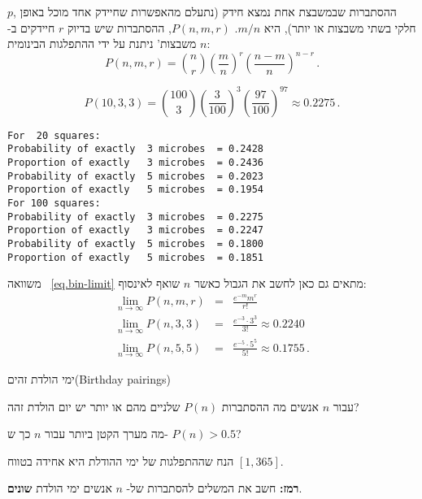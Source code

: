 \solution{}

$p$,
ההסתברות שבמשבצת אחת נמצא חידק (נתעלם מהאפשרות שחיידק אחד מוכל באופן חלקי בשתי משבצות או יותר), היא
$m/n$.
$P(n,m,r)$,
ההסתברות שיש בדיוק 
$r$
חיידקים ב-%
$n$
משבצות' ניתנת על ידי ההתפלגות הבינומית:
\[
P(n,m,r) = {n \choose r} \left(\frac{m}{n}\right)^r \left(\frac{n-m}{n}\right)^{n-r}\,.
\]

\[
P(10,3,3) = {100 \choose 3} \left(\frac{3}{100}\right)^3 \left(\frac{97}{100}\right)^{97}\approx 0.2275\,.
\]

\sml{}
\begin{verbatim}
For  20 squares:
Probability of exactly  3 microbes  = 0.2428
Proportion of exactly   3 microbes  = 0.2436
Probability of exactly  5 microbes  = 0.2023
Proportion of exactly   5 microbes  = 0.1954
For 100 squares:
Probability of exactly  3 microbes  = 0.2275
Proportion of exactly   3 microbes  = 0.2247
Probability of exactly  5 microbes  = 0.1800
Proportion of exactly   5 microbes  = 0.1851
\end{verbatim}


משוואה%
~\ref{eq.bin-limit}
מתאים גם כאן לחשב את הגבול כאשר 
$n$
שואף לאינסוף:
\begin{eqnarray*}
\lim_{n\rightarrow \infty}P(n,m,r) &=& \frac{e^{-m}m^r}{r!}\\
\lim_{n\rightarrow \infty} P(n,3,3) &=& \frac{e^{-3}\cdot 3^3}{3!}\approx 0.2240\\
\lim_{n\rightarrow \infty} P(n,5,5) &=& \frac{e^{-5}\cdot 5^5}{5!}\approx 0.1755\,.
\end{eqnarray*}




\begin{prob}{ימי הולדת זהים}{}{(Birthday pairings)}

עבור 
$n$
אנשים מה ההסתברות 
$P(n)$
שלניים מהם או יותר יש יום הולדת זהה?

מה מערך הקטן ביותר עבור 
$n$
כך ש-%
$P(n)>0.5$?

הנח שההתפלגות של ימי ההודלת היא אחידה בטווח
$[1,365]$.

\textbf{רמז:}
חשב את המשלים להסתברות של-%
$n$
אנשים ימי הולדת 
\textbf{שונים}.
\end{prob}

